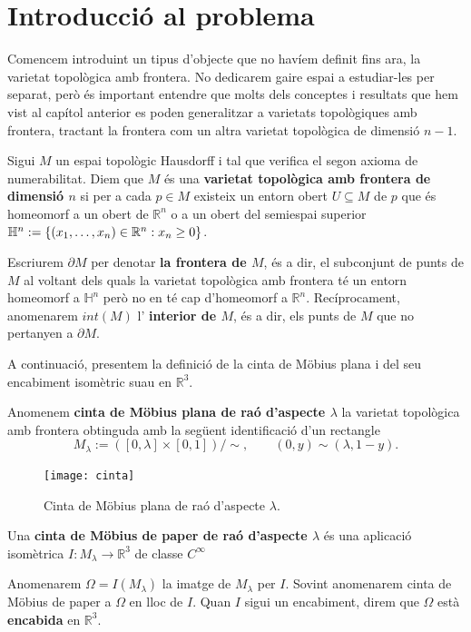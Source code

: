 \section{Introducció al problema}
Comencem introduint un tipus d'objecte que no havíem definit fins ara, la varietat topològica amb frontera. No dedicarem gaire espai a estudiar-les per separat, però és important entendre que molts dels conceptes i resultats que hem vist al capítol anterior es poden generalitzar a varietats topològiques amb frontera, tractant la frontera com un altra varietat topològica de dimensió $n-1$.
\begin{defi}\label{def:varietat_topologica_amb_frontera}
    Sigui $M$ un espai topològic Hausdorff i tal que verifica el segon axioma de numerabilitat. Diem que $M$ és una \textbf{varietat topològica amb frontera de dimensió $n$} si per a cada $p\in M$ existeix un entorn obert $U\subseteq M$ de $p$ que és homeomorf a un obert de $\mathbb R^n$ o a un obert del semiespai superior $\mathbb H^n := \{(x_1, \dots, x_n)\in\mathbb R^n:x_n\geq 0\}$. 
\end{defi}

\begin{nota}\label{nota:frontier_and_interior}
    Escriurem $\partial M$ per denotar \textbf{la frontera de $M$}, és a dir, el subconjunt de punts de $M$ al voltant dels quals la varietat topològica amb frontera té un entorn homeomorf a $\mathbb H^n$ però no en té cap d'homeomorf a $\mathbb R^n$. Recíprocament, anomenarem $int(M)$ l' \textbf{interior de $M$}, és a dir, els punts de $M$ que no pertanyen a $\partial M$.
\end{nota}

A continuació, presentem la definició de la cinta de Möbius plana i del seu encabiment isomètric suau en $\mathbb R^3$.
\begin{defi}
    Anomenem \textbf{cinta de Möbius plana de raó d'aspecte $\lambda$} la varietat topològica amb frontera obtinguda amb la següent identificació d'un rectangle
    $$M_\lambda := ([0,\lambda] \times [0,1])/\sim, \quad\quad (0,y)\sim(\lambda,1-y).$$
\end{defi}

\begin{figure}[htbp]
    \centering
    \texttt{[image: cinta]}
    \caption{Cinta de Möbius plana de raó d'aspecte $\lambda$.}
    \label{fig:mobius_plana}
\end{figure}


\begin{defi}\label{def:cinta_mobius_paper}
    Una \textbf{cinta de Möbius de paper de raó d'aspecte $\lambda$} és una aplicació isomètrica $I:M_{\lambda}\to\mathbb R^3$ de classe $C^\infty$
\end{defi}
\begin{nota}
    Anomenarem $\Omega=I(M_\lambda)$ la imatge de $M_\lambda$ per $I$. Sovint anomenarem cinta de Möbius de paper a $\Omega$ en lloc de $I$. Quan $I$ sigui un encabiment, direm que $\Omega$ està \textbf{encabida} en $\mathbb R^3$.
\end{nota}


